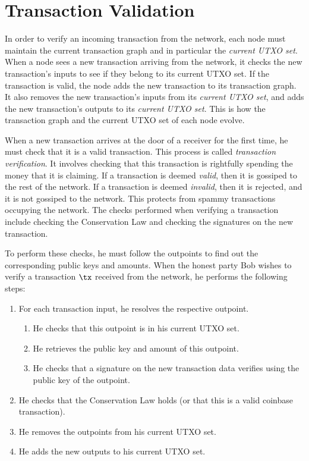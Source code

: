 \section{Transaction Validation}\label{sec.transaction.validation}

In order to verify an incoming transaction from the network, each node must maintain the current transaction
graph and in particular the \emph{current UTXO set}.
When a node sees a new transaction arriving from
the network, it checks the new transaction's inputs to see if they belong to its current UTXO set.
If the transaction is valid, the node adds the new transaction to its transaction graph.
It also removes the new transaction's inputs
from its \emph{current UTXO set}, and adds the new transaction's outputs to its \emph{current UTXO set}.
This is how the transaction graph and the current UTXO set of each node evolve.

When a new transaction arrives at the door of a receiver for the first time, he must check that it is
a valid transaction. This process is called \emph{transaction verification}. It involves checking that
this transaction is rightfully spending the money that it is claiming. If a transaction is deemed \emph{valid},
then it is gossiped to the rest of the network. If a transaction is deemed \emph{invalid}, then it is
rejected, and it is not gossiped to the network. This protects from spammy transactions occupying the
network. The checks performed when verifying a transaction include checking the Conservation Law
and checking the signatures on the new transaction.

To perform these checks, he must follow the outpoints to find out the corresponding
public keys and amounts. When the honest party  Bob wishes to verify a transaction $\tx$ received from
the network, he performs the following steps:

\begin{enumerate}
  \item For each transaction input, he resolves the respective outpoint.
  \begin{enumerate}
    \item He checks that this outpoint is in his current UTXO set. \label{enum.tx-double-spend}
    \item He retrieves the public key and amount of this outpoint.
    \item He checks that a signature on the new transaction data verifies using the public key of the outpoint.
  \end{enumerate}
  \item He checks that the Conservation Law holds (or that this is a valid coinbase transaction).
  \item He removes the outpoints from his current UTXO set.
  \item He adds the new outputs to his current UTXO set.
\end{enumerate}

